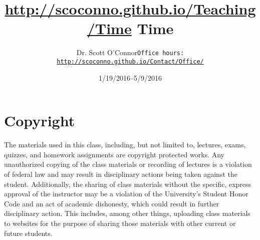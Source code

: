 \documentclass[article,oneside]{memoir}
\def\myauthor{Author}
\def\mytitle{Title }
\def\mycopyright{\myauthor}
\def\myweb{\href{http://scoconno.github.io/Teaching/Time}{http://scoconno.github.io/Teaching/Time}}
\def\myauthor{Dr. Scott O'Connor}
\def\mytitle{{\normalsize \myweb \newline} \HUGE Time}
\begin{document}
\setsansfont[Mapping=tex-text]{Myriad Pro} 
\setmonofont[Mapping=tex-text,Scale=0.8]{Georgia} 

\def\ind{\hangindent=1 true cm\hangafter=1 \noindent}
\def\labelitemi{$\cdot$}


\title{\LARGE \mytitle}     
\author{\Large\myauthor \newline \footnotesize\texttt{\noindent Office hours: \href{http://scoconno.github.io/Contact/Office/}{http://scoconno.github.io/Contact/Office/}}}
\date{1/19/2016--5/9/2016}


\maketitle




%
%

\section{Copyright}
The materials used in this class, including, but not limited to, lectures, exams, quizzes, and homework assignments are copyright protected works.  Any unauthorized copying of the class materials or recording of lectures is a violation of federal law and may result in disciplinary actions being taken against the student.  Additionally, the sharing of class materials without the specific, express approval of the instructor may be a violation of the University's Student Honor Code and an act of academic dishonesty, which could result in further disciplinary action.  This includes, among other things, uploading class materials to websites for the purpose of sharing those materials with other current or future students. 
\end{document}
